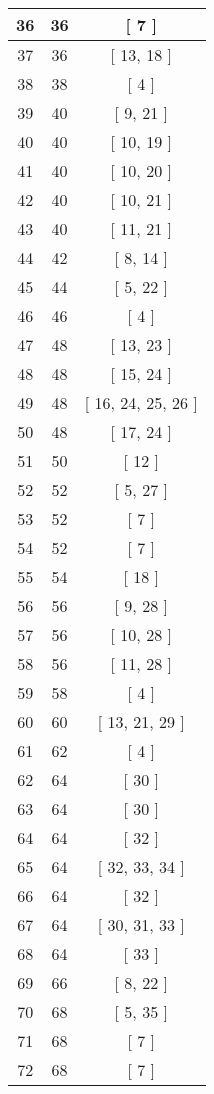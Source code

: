 \begin{center}
\begin{longtable}[H]{|| c c c ||}
36 & 36 & [ 7 ] \\ 
\hline
37 & 36 & [ 13, 18 ] \\ 
\hline
38 & 38 & [ 4 ] \\ 
\hline
39 & 40 & [ 9, 21 ] \\ 
\hline
40 & 40 & [ 10, 19 ] \\ 
\hline
41 & 40 & [ 10, 20 ] \\ 
\hline
42 & 40 & [ 10, 21 ] \\ 
\hline
43 & 40 & [ 11, 21 ] \\ 
\hline
44 & 42 & [ 8, 14 ] \\ 
\hline
45 & 44 & [ 5, 22 ] \\ 
\hline
46 & 46 & [ 4 ] \\ 
\hline
47 & 48 & [ 13, 23 ] \\ 
\hline
48 & 48 & [ 15, 24 ] \\ 
\hline
49 & 48 & [ 16, 24, 25, 26 ] \\ 
\hline
50 & 48 & [ 17, 24 ] \\ 
\hline
51 & 50 & [ 12 ] \\ 
\hline
52 & 52 & [ 5, 27 ] \\ 
\hline
53 & 52 & [ 7 ] \\ 
\hline
54 & 52 & [ 7 ] \\ 
\hline
55 & 54 & [ 18 ] \\ 
\hline
56 & 56 & [ 9, 28 ] \\ 
\hline
57 & 56 & [ 10, 28 ] \\ 
\hline
58 & 56 & [ 11, 28 ] \\ 
\hline
59 & 58 & [ 4 ] \\ 
\hline
60 & 60 & [ 13, 21, 29 ] \\ 
\hline
61 & 62 & [ 4 ] \\ 
\hline
62 & 64 & [ 30 ] \\ 
\hline
63 & 64 & [ 30 ] \\ 
\hline
64 & 64 & [ 32 ] \\ 
\hline
65 & 64 & [ 32, 33, 34 ] \\ 
\hline
66 & 64 & [ 32 ] \\ 
\hline
67 & 64 & [ 30, 31, 33 ] \\ 
\hline
68 & 64 & [ 33 ] \\ 
\hline
69 & 66 & [ 8, 22 ] \\ 
\hline
70 & 68 & [ 5, 35 ] \\ 
\hline
71 & 68 & [ 7 ] \\ 
\hline
72 & 68 & [ 7 ] \\ 
\hline

\end{longtable}
\end{center}
